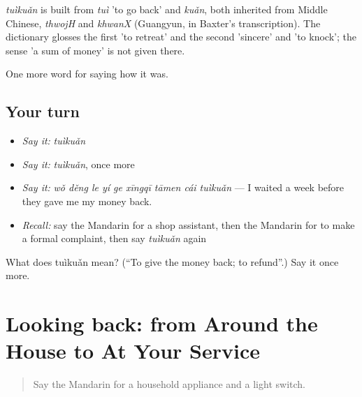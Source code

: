 \begin{cousinweb}
\emph{tuìkuǎn} is built from \emph{tuì} 'to go back' and \emph{kuǎn}, both inherited from Middle Chinese, \emph{thwojH} and \emph{khwanX} (Guangyun, in Baxter's transcription). The dictionary glosses the first 'to retreat' and the second 'sincere' and 'to knock'; the sense 'a sum of money' is not given there.
\end{cousinweb}

\begin{grammarlens}[title={What you've built}]
One more word for saying how it was.
\end{grammarlens}

\subsection*{Your turn}
\begin{itemize}
\raggedright
  \item \emph{Say it:} \emph{tuìkuǎn}
  \item \emph{Say it:} \emph{tuìkuǎn}, once more
  \item \emph{Say it:} \emph{wǒ děng le yí ge xīngqī tāmen cái tuìkuǎn} — I waited a week before they gave me my money back.
  \item \emph{Recall:} say the Mandarin for a shop assistant, then the Mandarin for to make a formal complaint, then say \emph{tuìkuǎn} again
\end{itemize}

\begin{tcolorbox}[breakable,colback=teal!4,colframe=teal!35!black,title={Before you move on}]
What does tuìkuǎn mean? (\textquotedblleft{}To give the money back; to refund\textquotedblright{}.) Say it once more.
\end{tcolorbox}
\section[(dialogue)]{Looking back: from Around the House to At Your Service}

\label{lesson:ZH-R525-review-520-525}



\begin{quote}
Say the Mandarin for a household appliance and a light switch.
\end{quote}

